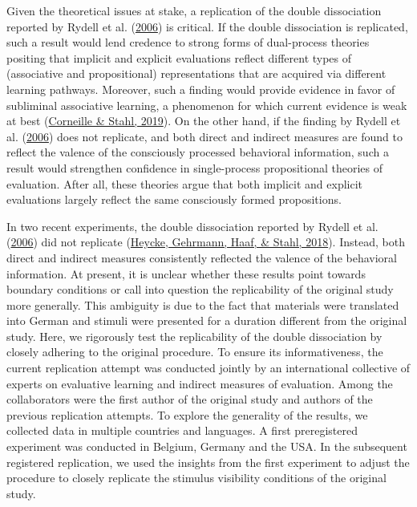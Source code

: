 \documentclass[
  man,floatsintext]{apa6}
\begin{document}
Given the theoretical issues at stake, a replication of the double dissociation reported by Rydell et al. (\protect\hyperlink{ref-rydell_two_2006}{2006}) is critical.
If the double dissociation is replicated, such a result would lend credence to strong forms of dual-process theories positing that implicit and explicit evaluations reflect different types of (associative and propositional) representations that are acquired via different learning pathways.
Moreover, such a finding would provide evidence in favor of subliminal associative learning, a phenomenon for which current evidence is weak at best (\protect\hyperlink{ref-corneilleAssociativeAttitudeLearning2018a}{Corneille \& Stahl, 2019}).
On the other hand, if the finding by Rydell et al. (\protect\hyperlink{ref-rydell_two_2006}{2006}) does not replicate, and both direct and indirect measures are found to reflect the valence of the consciously processed behavioral information, such a result would strengthen confidence in single-process propositional theories of evaluation.
After all, these theories argue that both implicit and explicit evaluations largely reflect the same consciously formed propositions.

In two recent experiments, the double dissociation reported by Rydell et al. (\protect\hyperlink{ref-rydell_two_2006}{2006}) did not replicate (\protect\hyperlink{ref-heycke_two_2018}{Heycke, Gehrmann, Haaf, \& Stahl, 2018}).
Instead, both direct and indirect measures consistently reflected the valence of the behavioral information.
At present, it is unclear whether these results point towards boundary conditions or call into question the replicability of the original study more generally.
This ambiguity is due to the fact that materials were translated into German and stimuli were presented for a duration different from the original study.
Here, we rigorously test the replicability of the double dissociation by closely adhering to the original procedure.
To ensure its informativeness, the current replication attempt was conducted jointly by an international collective of experts on evaluative learning and indirect measures of evaluation.
Among the collaborators were the first author of the original study and authors of the previous replication attempts.
To explore the generality of the results, we collected data in multiple countries and languages.
A first preregistered experiment was conducted in Belgium, Germany and the USA.
In the subsequent registered replication, we used the insights from the first experiment to adjust the procedure to closely replicate the stimulus visibility conditions of the original study.
\end{document}
